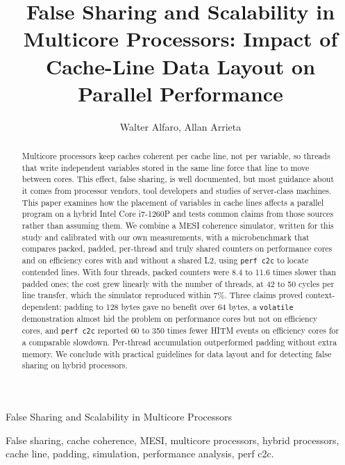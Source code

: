 \documentclass[journal]{IEEEtran}
\begin{document}
\title{False Sharing and Scalability in Multicore Processors: Impact of Cache-Line Data Layout on Parallel Performance}

\author{Walter Alfaro, Allan Arrieta}

%
{False Sharing and Scalability in Multicore Processors}

\maketitle

\begin{abstract}
Multicore processors keep caches coherent per cache line, not per variable, so
threads that write independent variables stored in the same line force that
line to move between cores. This effect, false sharing, is well documented,
but most guidance about it comes from processor vendors, tool developers and
studies of server-class machines. This paper examines how the placement of
variables in cache lines affects a parallel program on a hybrid Intel Core
i7-1260P and tests common claims from those sources rather than assuming them.
We combine a MESI coherence simulator, written for this study and calibrated
with our own measurements, with a microbenchmark that compares packed, padded,
per-thread and truly shared counters on performance cores and on efficiency
cores with and without a shared L2, using \texttt{perf c2c} to locate contended
lines. With four threads, packed counters were 8.4 to 11.6 times slower than
padded ones; the cost grew linearly with the number of threads, at 42 to 50
cycles per line transfer, which the simulator reproduced within 7\%. Three
claims proved context-dependent: padding to 128 bytes gave no benefit over
64 bytes, a \texttt{volatile} demonstration almost hid the problem on
performance cores but not on efficiency cores, and \texttt{perf c2c} reported 60
to 350 times fewer HITM events on efficiency cores for a comparable slowdown.
Per-thread accumulation outperformed padding without extra memory. We conclude
with practical guidelines for data layout and for detecting false sharing on
hybrid processors.
\end{abstract}

\begin{IEEEkeywords}
False sharing, cache coherence, MESI, multicore processors, hybrid processors, cache line, padding, simulation, performance analysis, perf c2c.
\end{IEEEkeywords}
\end{document}
